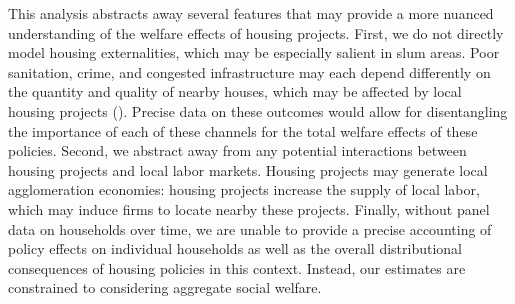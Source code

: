 \documentclass[12pt]{article}
\begin{document}
This analysis abstracts away several features that may provide a more nuanced understanding of the welfare effects of housing projects.  First, we do not directly model housing externalities, which may be especially salient in slum areas.  Poor sanitation, crime, and congested infrastructure may each depend differently on the quantity and quality of nearby houses, which may be affected by local housing projects (\cite{marxthere}).  Precise data on these outcomes would allow for disentangling the importance of each of these channels for the total welfare effects of these policies.  Second, we abstract away from any potential interactions between housing projects and local labor markets.  Housing projects may generate local agglomeration economies:  housing projects increase the supply of local labor, which may induce firms to locate nearby these projects.  Finally, without panel data on households over time, we are unable to provide a precise accounting of policy effects on individual households as well as the overall distributional consequences of housing policies in this context.  Instead, our estimates are constrained to considering aggregate social welfare.










\end{document}

